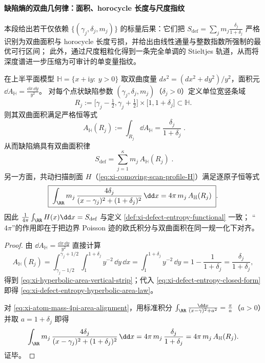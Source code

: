 \paragraph{缺陷熵的双曲几何律：面积、horocycle 长度与尺度指纹}
本段给出若干仅依赖 \(\{(\gamma_j,\delta_j,m_j)\}\) 的标量后果：它们把
\(\displaystyle S_{\mathrm{def}}=\sum_j m_j\frac{\delta_j}{1+\delta_j}\)
严格识别为双曲面积与 horocycle 长度亏损，并给出由线性通量与整数指数所强制的最优可行区间；
此外，通过尺度粗粒化得到一条完全单调的 Stieltjes 轨道，从而将深度谱进一步压缩为可审计的单变量指纹。

\begin{proposition}\label{prop:xi-defect-entropy-hyperbolic-area-law-4pi}
在上半平面模型 \(\mathbb{H}=\{x+\mathrm{i}y:\ y>0\}\) 取双曲度量
\(
ds^2=(dx^2+dy^2)/y^2
\)，面积元
\(
\dd A_{\mathbb{H}}=\frac{\dd x\,\dd y}{y^2}
\)。
对每个点状缺陷参数 \((\gamma_j,\delta_j,m_j)\)（\(\delta_j>0\)）定义单位宽竖条域
\[
R_j:=
\bigl[\gamma_j-\tfrac12,\gamma_j+\tfrac12\bigr]\times\bigl[1,1+\delta_j\bigr]\subset\mathbb{H}.
\]
则其双曲面积满足严格恒等式
\begin{equation}\label{eq:xi-hyperbolic-area-vertical-strip}
\boxed{\;
A_{\mathbb{H}}(R_j)
:=\int_{R_j}\dd A_{\mathbb{H}}
=\frac{\delta_j}{1+\delta_j}\; }.
\end{equation}
从而缺陷熵具有双曲面积律
\begin{equation}\label{eq:xi-defect-entropy-hyperbolic-area-law}
\boxed{\;
S_{\mathrm{def}}
=\sum_{j=1}^{\kappa}m_j\,A_{\mathbb{H}}(R_j)\; }.
\end{equation}
另一方面，共动扫描剖面 \(H\)（\eqref{eq:xi-comoving-scan-profile-H}）满足逐原子恒等式
\begin{equation}\label{eq:xi-atom-mass-4pi-area-alignment}
\boxed{\;
\int_{\RR} m_j\,\frac{4\delta_j}{(x-\gamma_j)^2+(1+\delta_j)^2}\,\dd x
=4\pi\,m_j\,A_{\mathbb{H}}(R_j)\; }.
\end{equation}
因此
\(
\frac{1}{4\pi}\int_{\RR}H(x)\dd x
=S_{\mathrm{def}}
\)
与定义 \ref{def:xi-defect-entropy-functional} 一致；
“\(4\pi\)”的作用即在于把边界 Poisson 迹的欧氏积分与双曲面积在同一规一化下对齐。
\end{proposition}

\begin{proof}
由 \(\dd A_{\mathbb{H}}=\frac{\dd x\,\dd y}{y^2}\) 直接计算
\[
A_{\mathbb{H}}(R_j)
=\int_{\gamma_j-1/2}^{\gamma_j+1/2}\int_{1}^{1+\delta_j}y^{-2}\,\dd y\,\dd x
=\int_{1}^{1+\delta_j}y^{-2}\,\dd y
=1-\frac{1}{1+\delta_j}
=\frac{\delta_j}{1+\delta_j},
\]
得到 \eqref{eq:xi-hyperbolic-area-vertical-strip}；代入 \eqref{eq:xi-defect-entropy-closed-form} 即得 \eqref{eq:xi-defect-entropy-hyperbolic-area-law}。
\par
对 \eqref{eq:xi-atom-mass-4pi-area-alignment}，用标准积分
\(
\int_{\RR}\frac{\dd x}{(x-\gamma)^2+a^2}=\frac{\pi}{a}
\)（\(a>0\)）并取 \(a=1+\delta_j\) 即得
\[
\int_{\RR} m_j\,\frac{4\delta_j}{(x-\gamma_j)^2+(1+\delta_j)^2}\,\dd x
=4\pi\,m_j\,\frac{\delta_j}{1+\delta_j}
=4\pi\,m_j\,A_{\mathbb{H}}(R_j).
\]
证毕。
\end{proof}

